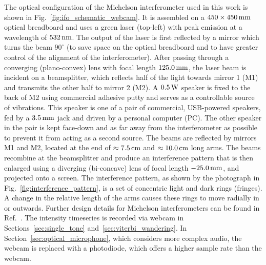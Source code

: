 \documentclass[paper-main.tex]{subfiles}
\begin{document}
The optical configuration of the Michelson interferometer used in this work is shown in Fig.~\ref{fig:ifo_schematic_webcam}.
It is assembled on a $450 \times 450 \,{\rm mm} $ optical breadboard and uses a green laser (top-left) with peak emission at a wavelength of $532\,{\rm nm}$.
The output of the laser is first reflected by a mirror which turns the beam $90^{\circ}$ (to save space on the optical breadboard and to have greater control of the alignment of the interferometer).
After passing through a converging (plano-convex) lens with focal length $125.0\,{\rm mm}$, the laser beam is incident on a beamsplitter, which reflects half of the light towards mirror 1 (M1) and transmits the other half to mirror 2 (M2). 
A $0.5\,{\rm W}$ speaker is fixed to the back of M2 using commercial adhesive putty and serves as a controllable source of vibrations. 
This speaker is one of a pair of commercial, USB-powered speakers, fed by a $3.5\,{\rm mm}$ jack and driven by a personal computer (PC). 
The other speaker in the pair is kept face-down and as far away from the interferometer as possible to prevent it from acting as a second source.
The beams are reflected by mirrors M1 and M2, located at the end of $\approx 7.5\,{\rm cm}$ and $\approx 10.0\,{\rm cm}$ long arms.
The beams recombine at the beamsplitter and produce an interference pattern that is then enlarged using a diverging (bi-concave) lens of focal length $-25.0\,{\rm mm}$, and projected onto a screen.
The interference pattern, as shown by the photograph in Fig.~\ref{fig:interference_pattern}, is a set of concentric light and dark rings (fringes). 
A change in the relative length of the arms causes these rings to move radially in or outwards.
Further design details for Michelson interferometers can be found in Ref.~\cite{TTExhibit:2020}.
The intensity timeseries is recorded via webcam in Sections~\ref{sec:single_tone} and~\ref{sec:viterbi_wandering}.
In Section~\ref{sec:optical_microphone}, which considers more complex audio, the webcam is replaced with a photodiode, which offers a higher sample rate than the webcam. 
\end{document}
